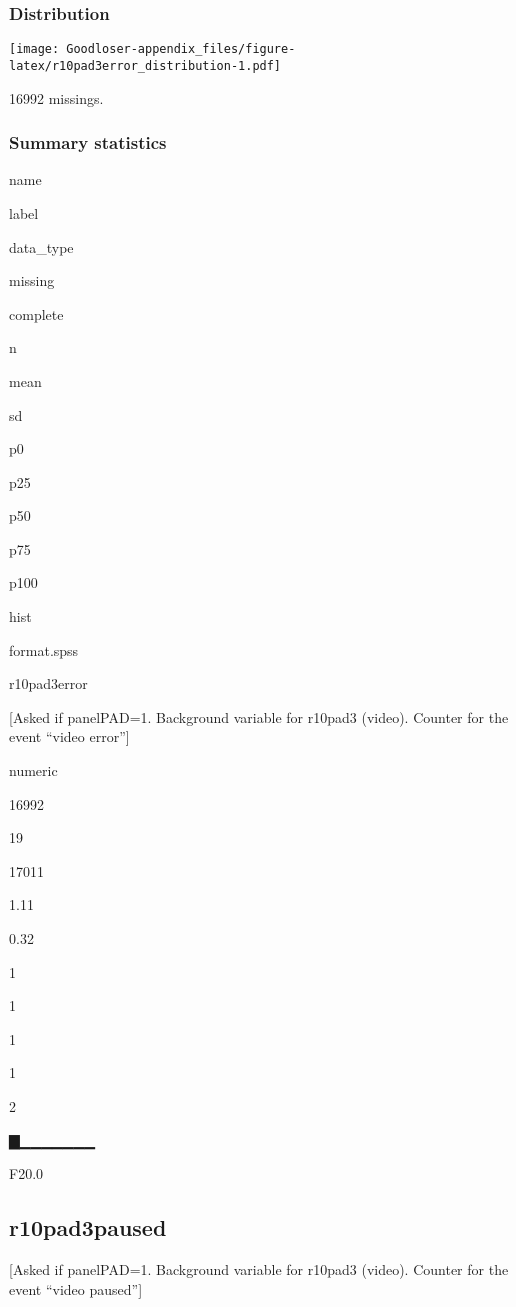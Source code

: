 \documentclass[]{book}
\begin{document}
\subsubsection{Distribution}\label{r10pad3error_distribution}

\texttt{[image: Goodloser-appendix\_files/figure-latex/r10pad3error\_distribution-1.pdf]}

16992 missings.

\subsubsection{Summary statistics}\label{r10pad3error_summary}

name

label

data\_type

missing

complete

n

mean

sd

p0

p25

p50

p75

p100

hist

format.spss

r10pad3error

{[}Asked if panelPAD=1. Background variable for r10pad3 (video). Counter
for the event ``video error''{]}

numeric

16992

19

17011

1.11

0.32

1

1

1

1

2

▇▁▁▁▁▁▁▁

F20.0

\subsection{r10pad3paused}\label{r10pad3paused}

{[}Asked if panelPAD=1. Background variable for r10pad3 (video). Counter
for the event ``video paused''{]}
\end{document}
